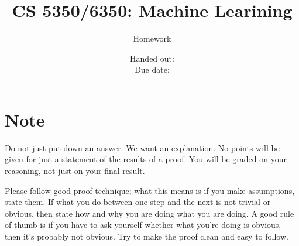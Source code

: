 \documentclass[12pt, fullpage,letterpaper]{article}
\title{CS 5350/6350: Machine Learining \semester}
\author{Homework \assignmentId}
\date{Handed out: \releaseDate\\
  Due date: \dueDate}
\begin{document}
\maketitle




\section*{Note}
Do not just put down an answer. We want an explanation. No points will
be given for just a statement of the results of a proof. You will be
graded on your reasoning, not just on your final result. 

Please follow good proof technique; what this means is if you make
assumptions, state them. If what you do between one step and the next
is not trivial or obvious, then state how and why you are doing what
you are doing. A good rule of thumb is if you have to ask yourself
whether what you're doing is obvious, then it's probably not obvious.
Try to make the proof clean and easy to follow.






\end{document}
